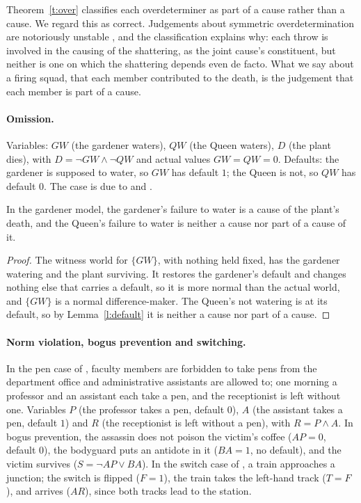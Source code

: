 \documentclass{situationist-preprint}
\begin{document}
Theorem~\ref{t:over} classifies each overdeterminer as part of a cause rather than a cause. We regard this as correct. Judgements about symmetric overdetermination are notoriously unstable \citep[ch.~3]{PaulHall2013}, and the classification explains why: each throw is involved in the causing of the shattering, as the joint cause's constituent, but neither is one on which the shattering depends even de facto. What we say about a firing squad, that each member contributed to the death, is the judgement that each member is part of a cause.

\paragraph{Omission.} Variables: $\mathit{GW}$ (the gardener waters), $\mathit{QW}$ (the Queen waters), $D$ (the plant dies), with $D = \neg\mathit{GW} \wedge \neg\mathit{QW}$ and actual values $\mathit{GW} = \mathit{QW} = 0$. Defaults: the gardener is supposed to water, so $\mathit{GW}$ has default $1$; the Queen is not, so $\mathit{QW}$ has default $0$. The case is due to \citet{Beebee2004} and \citet{McGrath2005}.

\begin{theorem}[Omission]\label{t:omission}
In the gardener model, the gardener's failure to water is a cause of the plant's death, and the Queen's failure to water is neither a cause nor part of a cause of it.
\end{theorem}

\begin{proof}
The witness world for $\{\mathit{GW}\}$, with nothing held fixed, has the gardener watering and the plant surviving. It restores the gardener's default and changes nothing else that carries a default, so it is more normal than the actual world, and $\{\mathit{GW}\}$ is a normal difference-maker. The Queen's not watering is at its default, so by Lemma~\ref{l:default} it is neither a cause nor part of a cause.
\end{proof}

\paragraph{Norm violation, bogus prevention and switching.} In the pen case of \citet{KnobeFraser2008}, faculty members are forbidden to take pens from the department office and administrative assistants are allowed to; one morning a professor and an assistant each take a pen, and the receptionist is left without one. Variables $P$ (the professor takes a pen, default $0$), $A$ (the assistant takes a pen, default $1$) and $R$ (the receptionist is left without a pen), with $R = P \wedge A$. In bogus prevention, the assassin does not poison the victim's coffee ($\mathit{AP} = 0$, default $0$), the bodyguard puts an antidote in it ($\mathit{BA} = 1$, no default), and the victim survives ($S = \neg \mathit{AP} \vee \mathit{BA}$). In the switch case of \citet{Hall2000}, a train approaches a junction; the switch is flipped ($F = 1$), the train takes the left-hand track ($T = F$), and arrives ($\mathit{AR}$), since both tracks lead to the station.
\end{document}
